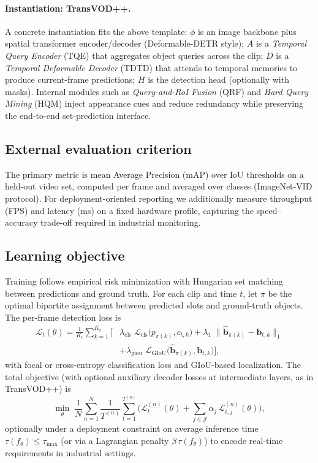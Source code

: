\documentclass{article}
\begin{document}
\paragraph{Instantiation: TransVOD++.}
A concrete instantiation fits the above template: $\phi$ is an image backbone plus spatial transformer encoder/decoder (Deformable-DETR style); $A$ is a \emph{Temporal Query Encoder} (TQE) that aggregates object queries across the clip; $D$ is a \emph{Temporal Deformable Decoder} (TDTD) that attends to temporal memories to produce current-frame predictions; $H$ is the detection head (optionally with masks). Internal modules such as \emph{Query-and-RoI Fusion} (QRF) and \emph{Hard Query Mining} (HQM) inject appearance cues and reduce redundancy while preserving the end-to-end set-prediction interface.

\subsection{External evaluation criterion}
The primary metric is mean Average Precision (mAP) over IoU thresholds on a held-out video set, computed per frame and averaged over classes (ImageNet-VID protocol). For deployment-oriented reporting we additionally measure throughput (FPS) and latency (ms) on a fixed hardware profile, capturing the speed–accuracy trade-off required in industrial monitoring.

\subsection{Learning objective}
Training follows empirical risk minimization with Hungarian set matching between predictions and ground truth. For each clip and time $t$, let $\pi$ be the optimal bipartite assignment between predicted slots and ground-truth objects. The per-frame detection loss is
\begin{align*}
\mathcal{L}_t(\theta)=\frac{1}{K_t}\sum_{k=1}^{K_t}\Big[
&\lambda_{\text{cls}}\;\mathcal{L}_{\text{cls}}\!\big(p_{\pi(k)}, c_{t,k}\big)
+ \lambda_{1}\;\|\hat{\mathbf{b}}_{\pi(k)}-\mathbf{b}_{t,k}\|_1 \\
&+ \lambda_{\text{giou}}\;\mathcal{L}_{\text{GIoU}}\!\big(\hat{\mathbf{b}}_{\pi(k)}, \mathbf{b}_{t,k}\big)
\Big],
\end{align*}
with focal or cross-entropy classification loss and GIoU-based localization. The total objective (with optional auxiliary decoder losses at intermediate layers, as in TransVOD++) is
\[
\min_{\theta}\;\frac{1}{N}\sum_{n=1}^{N}\frac{1}{T^{(n)}}\sum_{t=1}^{T^{(n)}}
\Big(\mathcal{L}_t^{(n)}(\theta)+\sum_{j\in\mathcal{J}}\alpha_j\,\mathcal{L}^{(n)}_{t,j}(\theta)\Big),
\]
optionally under a deployment constraint on average inference time
$\tau(f_\theta)\le \tau_{\max}$ (or via a Lagrangian penalty $\beta\,\tau(f_\theta)$)
to encode real-time requirements in industrial settings.
\end{document}
